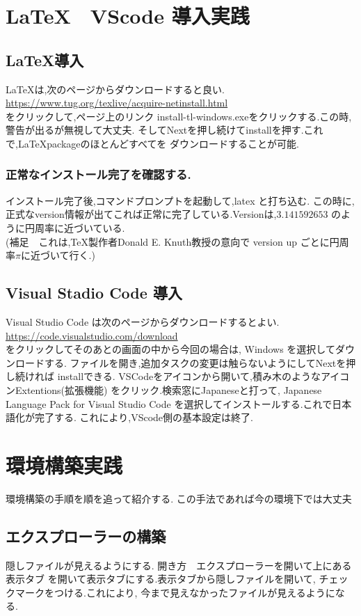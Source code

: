 \documentclass{ltjsarticle}
\begin{document}
\section{\LaTeX　VScode 導入実践}

\subsection{\LaTeX 導入}
\LaTeX は,次のページからダウンロードすると良い.\\
\url{https://www.tug.org/texlive/acquire-netinstall.html}\\
をクリックして,ページ上のリンク install-tl-windows.exeをクリックする.この時,
警告が出るが無視して大丈夫.
そしてNextを押し続けてinstallを押す.これで,\LaTeX packageのほとんどすべてを
ダウンロードすることが可能.
\subsubsection*{正常なインストール完了を確認する.}
インストール完了後,コマンドプロンプトを起動して,latex と打ち込む.
この時に,正式なversion情報が出てこれば正常に完了している.Versionは,$3.141592653$
のように円周率に近づいている.\\
(補足　これは,\TeX 製作者Donald E. Knuth教授の意向で
version up ごとに円周率$\pi$に近づいて行く.)
\subsection{Visual Stadio Code 導入}
Visual Studio Code は次のページからダウンロードするとよい.\\
\url{https://code.visualstudio.com/download}\\
をクリックしてそのあとの画面の中から今回の場合は,
Windows を選択してダウンロードする.
ファイルを開き,追加タスクの変更は触らないようにしてNextを押し続ければ
installできる.
VSCodeをアイコンから開いて,積み木のようなアイコンExtentions(拡張機能)
をクリック.検索窓にJapaneseと打って,
Japanese Language Pack for Visual Studio Code
を選択してインストールする.これで日本語化が完了する.
これにより,VScode側の基本設定は終了.
\section{環境構築実践}
環境構築の手順を順を追って紹介する.
この手法であれば今の環境下では大丈夫
\subsection{エクスプローラーの構築}
隠しファイルが見えるようにする.
開き方　エクスプローラーを開いて上にある表示タブ
を開いて表示タブにする.表示タブから隠しファイルを開いて,
チェックマークをつける.これにより,
今まで見えなかったファイルが見えるようになる.
\end{document}
